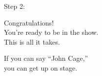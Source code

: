 \documentclass{article}
\begin{document}
\begin{center}

\thispagestyle{empty}


\vspace{2in}


  {\Huge

    Step 2:

    Congratulations! \\
    You're ready to be in the show. \\
    This is all it takes.

    \vspace{1in}

    If you can say ``John Cage,'' \\
    you can get up on stage.

  }

  \vfill

   \\

  \end{center}
\end{document}
